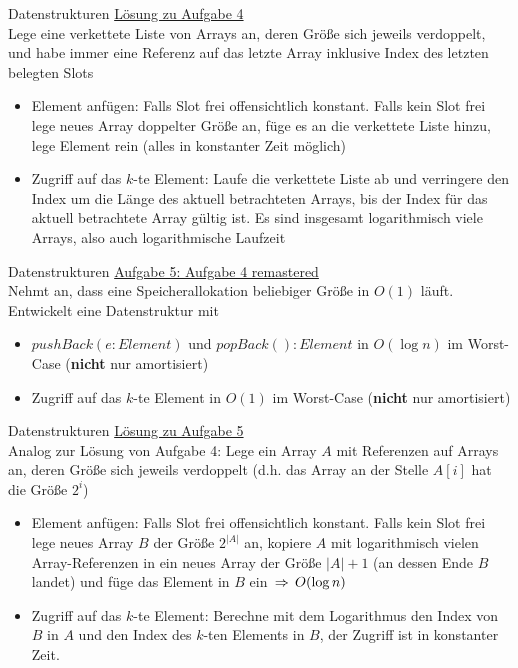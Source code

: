 \begin{frame}{Datenstrukturen}
	\underline{Lösung zu Aufgabe 4} \\
	Lege eine verkettete Liste von Arrays an, deren Größe sich jeweils verdoppelt, und habe immer eine Referenz auf das letzte Array inklusive Index des letzten belegten Slots
	\pause
	\begin{itemize}
		\item Element anfügen: Falls Slot frei \impl offensichtlich konstant. Falls kein Slot frei \impl lege neues Array doppelter Größe an, füge es an die verkettete Liste hinzu, lege Element rein (alles in konstanter Zeit möglich)
		\pause
		\item Zugriff auf das $k$-te Element: Laufe die verkettete Liste ab und verringere den Index um die Länge des aktuell betrachteten Arrays, bis der Index für das aktuell betrachtete Array gültig ist. Es sind insgesamt logarithmisch viele Arrays, also auch logarithmische Laufzeit
	\end{itemize}
\end{frame}



\begin{frame}{Datenstrukturen}
	\underline{Aufgabe 5: Aufgabe 4 remastered} \\
	Nehmt an, dass eine Speicherallokation beliebiger Größe in $O(1)$ läuft. Entwickelt eine Datenstruktur mit
	\begin{itemize}
		\item $pushBack(e : Element)$ und $popBack() : Element$ in $O(\log n)$ im Worst-Case (\textbf{nicht} nur amortisiert)
		\item Zugriff auf das $k$-te Element in $O(1)$ im Worst-Case (\textbf{nicht} nur amortisiert)
	\end{itemize}
\end{frame}

\begin{frame}{Datenstrukturen}
	\underline{Lösung zu Aufgabe 5} \\
	Analog zur Lösung von Aufgabe 4: Lege ein Array $A$ mit Referenzen auf Arrays an, deren Größe sich jeweils verdoppelt (d.h. das Array an der Stelle $A[i]$ hat die Größe $2^i$)
	\pause
	\begin{itemize}
		\item Element anfügen: Falls Slot frei \impl offensichtlich konstant. Falls kein Slot frei \impl lege neues Array $B$ der Größe $2^{|A|}$ an, kopiere $A$ mit logarithmisch vielen Array-Referenzen in ein neues Array der Größe $|A|+1$ (an dessen Ende $B$ landet) und füge das Element in $B$ ein $\impl O(\log n)$
		\pause
		\item Zugriff auf das $k$-te Element: Berechne mit dem Logarithmus den Index von $B$ in $A$ und den Index des $k$-ten Elements in $B$, der Zugriff ist in konstanter Zeit.
	\end{itemize}
\end{frame}
	

